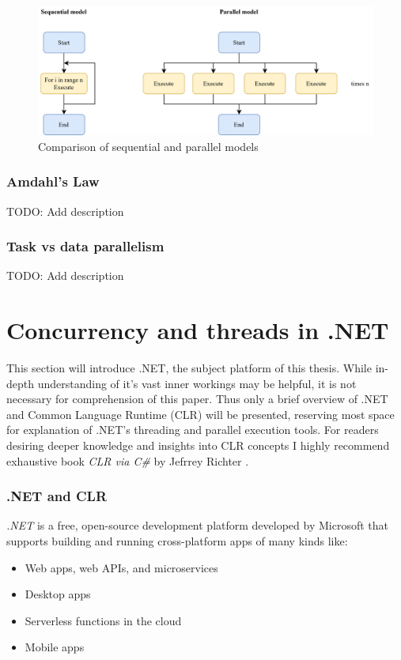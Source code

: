 \begin{figure}[htb]
	\centering
		\includegraphics[scale=1.0]{figures02/seqvspar.png}
		\caption{Comparison of sequential and parallel models}
	\label{fig:seqvspar}
\end{figure}

\subsubsection{Amdahl's Law}
TODO: Add description
\subsubsection{Task vs data parallelism}
TODO: Add description
\clearpage
\section{Concurrency and threads in .NET}
This section will introduce .NET, the subject platform of this thesis. While in-depth understanding of it's vast inner workings may be helpful, it is not necessary for comprehension of this paper. Thus only a brief overview of .NET and Common Language Runtime (CLR) will be presented, reserving most space for explanation of .NET's threading and parallel execution tools. For readers desiring deeper knowledge and insights into CLR concepts I highly recommend exhaustive book \emph{CLR via C\#} by Jefrrey Richter \cite{richter}.

\subsubsection{.NET and CLR}
\emph{.NET} is a free, open-source development platform developed by Microsoft that supports building and running cross-platform apps of many kinds like:
\begin{itemize}
	\item Web apps, web APIs, and microservices
	\item Desktop apps
	\item Serverless functions in the cloud
	\item Mobile apps
\end{itemize}

